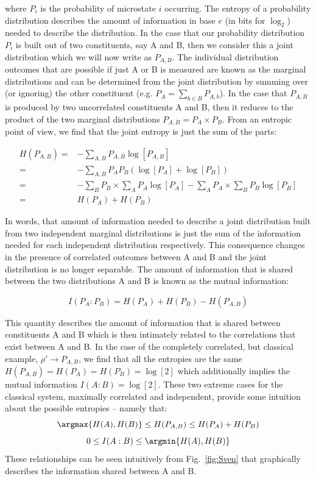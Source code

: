 where $P_i$ is the probability of microstate $i$ occurring. The entropy of a probability distribution describes the amount of information in base $e$ (in bits for $\log_2$) needed to describe the distribution. In the case that our probability distribution $P_i$ is built out of two constituents, say A and B, then we consider this a joint distribution which we will now write as $P_{A,B}$. The individual distribution outcomes that are possible if just A or B is measured are known as the marginal distributions and can be determined from the joint distribution by summing over (or ignoring) the other constituent (e.g. $P_A = \sum_{b \in B} P_{A,b}$). In the case that $P_{A,B}$ is produced by two uncorrelated constituents A and B, then it reduces to the product of the two marginal distributions $P_{A,B} = P_A \times P_B$. From an entropic point of view, we find that the joint entropy is just the sum of the parts:

\begin{equation}
\begin{aligned}
H(P_{A,B}) = & -\sum_{A,B} P_{A,B} \log[ P_{A,B} ]  \\ 
= & -\sum_{A,B} P_A P_B \left ( \log[P_A] + \log[P_B] \right) \\
 = & -\sum_B P_B \times \sum_A P_A \log[P_A] - \sum_A P_A \times \sum_B P_B \log[P_B]  \\
  = & H(P_A) + H(P_B)
\end{aligned}
\label{eqn:HAB}
\end{equation}

In words, that amount of information needed to describe a joint distribution built from two independent marginal distributions is just the sum of the information needed for each independent distribution respectively. This consequence changes in the presence of correlated outcomes between A and B and the joint distribution is no longer separable. The amount of information that is shared between the two distributions A and B is known as the mutual information:

\begin{equation}
\label{eqn:MI}
I(P_A:P_B) = H(P_A) + H(P_B) - H(P_{A,B})
\end{equation}

This quantity describes the amount of information that is shared between constituents A and B which is then intimately related to the correlations that exist between A and B. In the case of the completely correlated, but classical example,  $\rho' \rightarrow P_{A,B}$,  we find that all the entropies are the same $H(P_{A,B})=H(P_A)=H(P_B) = \log[2]$ which additionally implies the mutual information $I(A:B) = \log[2]$. These two extreme cases for the classical system, maximally correlated and independent, provide some intuition about the possible entropies -- namely that:
\[
\argmax \{ H(A), H(B) \} \leq H(P_{A,B}) \leq H(P_A) + H(P_B)
\]
\[
0 \leq I(A:B) \leq \argmin\{ H(A), H(B) \} 
\]
These relationships can be seen intuitively from Fig.~\ref{fig:Sven} that graphically describes the information shared between A and B.


